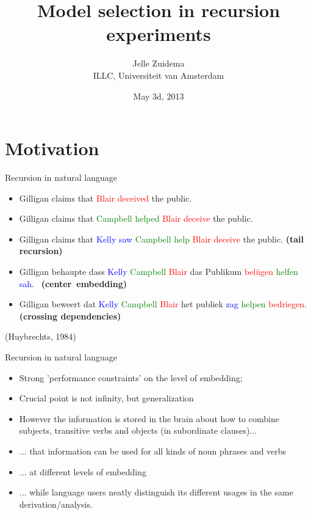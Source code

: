 \documentclass[xcolor=table,handout]{beamer}
\title{Model selection in recursion experiments}
\author{Jelle Zuidema\\ ILLC, Universiteit van Amsterdam}
\date{May 3d, 2013}
\newcommand{\blue}[1]{\textcolor{blue}{#1}}
\newcommand{\red}[1]{\textcolor{red}{#1}}
\newcommand{\green}[1]{\textcolor{green}{#1}}
\begin{document}
\begin{frame}
\titlepage
\end{frame}

\section{Motivation}
\label{sec:motivation}

\begin{frame}{Recursion in natural language}
\begin{itemize}[<+>]
  \item Gilligan claims that \red{Blair deceived} the
    public. 
  \item Gilligan claims that \green{Campbell helped} \red{Blair deceive} the
    public. 
  \item Gilligan claims that \blue{Kelly saw} \green{Campbell help} \red{Blair deceive} the
    public. \hfill \textbf{(tail recursion)}
  \item Gilligan behaupte dass \blue{Kelly} \green{Campbell} \red{Blair} das Publikum \red{bel\"ugen}
    \green{helfen} \blue{sah}. \hfill~\textbf{(center~embedding)}
  \item Gilligan beweert dat \blue{Kelly} \green{Campbell} \red{Blair} het publiek \blue{zag} \green{helpen}
    \red{bedriegen}. \hfill \textbf{(crossing dependencies)}
\end{itemize}
(Huybrechts, 1984)
\end{frame}

\begin{frame}{Recursion in natural language}
  \begin{itemize}
  \item Strong 'performance constraints' on the level of embedding;
  \item Crucial point is not infinity, but generalization
  \item However the information is stored in the brain about how to
    combine subjects, transitive verbs and objects (in subordinate clauses)...
  \item ... that information can be used for all kinds of noun phrases
    and verbs
  \item ... at different levels of embedding
  \item ... while language users neatly distinguish its different
    usages in the same derivation/analysis.
  \end{itemize}
\end{frame}
\end{document}
